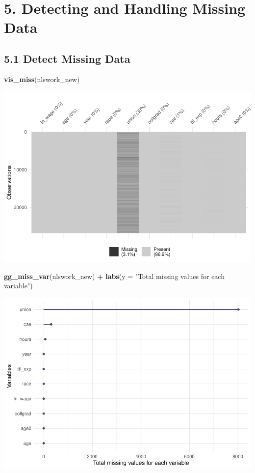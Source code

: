 \documentclass[
]{article}
\newenvironment{Shaded}{\begin{snugshade}}{\end{snugshade}}
\newcommand{\AttributeTok}[1]{\textcolor[rgb]{0.13,0.29,0.53}{#1}}
\newcommand{\FunctionTok}[1]{\textcolor[rgb]{0.13,0.29,0.53}{\textbf{#1}}}
\newcommand{\NormalTok}[1]{#1}
\newcommand{\SpecialCharTok}[1]{\textcolor[rgb]{0.81,0.36,0.00}{\textbf{#1}}}
\newcommand{\StringTok}[1]{\textcolor[rgb]{0.31,0.60,0.02}{#1}}
\begin{document}
\hypertarget{detecting-and-handling-missing-data}{%
\section{5. Detecting and Handling Missing
Data}\label{detecting-and-handling-missing-data}}

\hypertarget{detect-missing-data}{%
\subsection{5.1 Detect Missing Data}\label{detect-missing-data}}

\begin{Shaded}
\begin{Highlighting}[]
\FunctionTok{vis\_miss}\NormalTok{(nlswork\_new)}
\end{Highlighting}
\end{Shaded}

\includegraphics{RIntro_files/figure-latex/unnamed-chunk-7-1.pdf}

\begin{Shaded}
\begin{Highlighting}[]
\FunctionTok{gg\_miss\_var}\NormalTok{(nlswork\_new) }\SpecialCharTok{+} \FunctionTok{labs}\NormalTok{(}\AttributeTok{y =} \StringTok{"Total missing values for each variable"}\NormalTok{)}
\end{Highlighting}
\end{Shaded}

\includegraphics{RIntro_files/figure-latex/unnamed-chunk-8-1.pdf}
\end{document}
